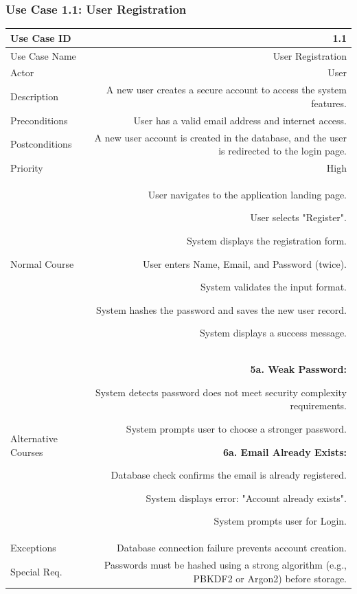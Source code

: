 \documentclass[11pt,a4paper]{report}
\begin{document}
\subsubsection{Use Case 1.1: User Registration}
\begin{tabularx}{\textwidth}{|L|R|}
	\hline
	Use Case ID & 1.1 \\ \hline
	Use Case Name & User Registration \\ \hline
	Actor & User \\ \hline
	Description & A new user creates a secure account to access the system features. \\ \hline
	Preconditions & User has a valid email address and internet access. \\ \hline
	Postconditions & A new user account is created in the database, and the user is redirected to the login page. \\ \hline
	Priority & High \\ \hline
	Normal Course & 
	\begin{normalsteps}
		\item User navigates to the application landing page.
		\item User selects "Register".
		\item System displays the registration form.
		\item User enters Name, Email, and Password (twice).
		\item System validates the input format.
		\item System hashes the password and saves the new user record.
		\item System displays a success message.
	\end{normalsteps} \\ \hline
	Alternative Courses & 
	\textbf{5a. Weak Password:} 
	\begin{altsteps}
		\item System detects password does not meet security complexity requirements.
		\item System prompts user to choose a stronger password.
	\end{altsteps} 
	\textbf{6a. Email Already Exists:} 
	\begin{altsteps}
		\item Database check confirms the email is already registered.
		\item System displays error: "Account already exists".
		\item System prompts user for Login.
	\end{altsteps} \\ \hline
	Exceptions & Database connection failure prevents account creation. \\ \hline
	Special Req. & Passwords must be hashed using a strong algorithm (e.g., PBKDF2 or Argon2) before storage. \\ \hline
\end{tabularx}
\end{document}
